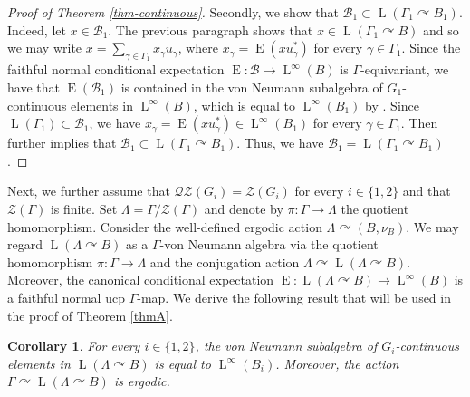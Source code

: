 \documentclass[11pt]{article}
\newtheorem{cor}[thm]{Corollary}
\theoremstyle{definition}
\DeclareMathOperator{\rE}{ E}
\DeclareMathOperator{\rL}{L}
\begin{document}
\begin{proof}[Proof of Theorem \ref{thm-continuous}]
Secondly, we show that $\mathscr B_1 \subset \rL(\Gamma_1 \curvearrowright B_1)$. Indeed, let $x \in \mathscr B_1$. The previous paragraph shows that $x \in \rL(\Gamma_1 \curvearrowright B)$ and so we may write $x = \sum_{\gamma \in \Gamma_1} x_\gamma u_\gamma$, where $x_\gamma = \rE(x u_\gamma^*)$ for every $\gamma \in \Gamma_1$. Since the faithful normal conditional expectation $\rE : \mathscr B \to \rL^\infty(B)$ is $\Gamma$-equivariant, we have that $\rE(\mathscr B_1)$ is contained in the von Neumann subalgebra of $G_1$-continuous elements in $\rL^\infty(B)$, which is equal to $\rL^\infty(B_1)$ by \cite[Lem.\,5.4]{BBHP20}. Since $\rL(\Gamma_1) \subset \mathscr B_1$, we have $x_\gamma = \rE(x u_\gamma^*) \in \rL^\infty(B_1)$ for every $\gamma \in \Gamma_1$. Then \cite[Cor.\,3.4]{Su18} further implies that $\mathscr B_1 \subset \rL(\Gamma_1 \curvearrowright B_1)$. Thus, we have $\mathscr B_1 = \rL(\Gamma_1 \curvearrowright B_1)$.
\end{proof}

Next, we further assume that $\mathscr{Q}\mathscr{Z}(G_i) = \mathscr Z(G_i)$ for every $i \in \{1, 2\}$ and that $\mathscr Z(\Gamma)$ is finite. Set $\Lambda = \Gamma/\mathscr Z(\Gamma)$ and denote by $\pi : \Gamma \to \Lambda$ the quotient homomorphism. Consider the well-defined ergodic action $\Lambda \curvearrowright (B, \nu_B)$. We may regard $\rL(\Lambda \curvearrowright B)$ as a $\Gamma$-von Neumann algebra via the quotient homomorphism $\pi : \Gamma \to \Lambda$ and the conjugation action $\Lambda \curvearrowright \rL(\Lambda \curvearrowright B)$. Moreover, the canonical conditional expectation $\rE : \rL(\Lambda \curvearrowright B) \to \rL^\infty(B)$ is a faithful normal ucp $\Gamma$-map. We derive the following result that will be used in the proof of Theorem \ref{thmA}.

\begin{cor}\label{cor-ergodic}
For every $i \in \{1, 2\}$, the von Neumann subalgebra of $G_i$-continuous elements in $\rL(\Lambda \curvearrowright B)$ is equal to $\rL^\infty(B_i)$. Moreover, the action $\Gamma \curvearrowright \rL(\Lambda \curvearrowright B)$ is ergodic.
\end{cor}
\end{document}
